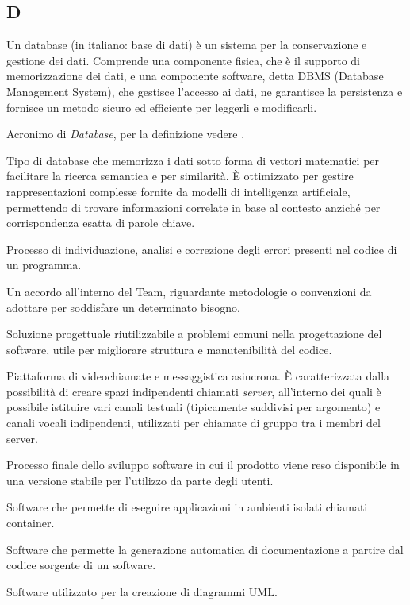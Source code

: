 \begin{center}
\section*{D}
\end{center}

Un database (in italiano: base di dati) è un sistema per la conservazione e gestione dei dati. Comprende una componente fisica, che è il supporto di memorizzazione dei dati, e una componente software, detta DBMS (Database Management System), che gestisce l’accesso ai dati, ne garantisce la persistenza e fornisce un metodo sicuro ed efficiente per leggerli e modificarli.

Acronimo di \textit{Database}, per la definizione vedere .

Tipo di database che memorizza i dati sotto forma di vettori matematici per facilitare la ricerca semantica e per similarità. È ottimizzato per gestire rappresentazioni complesse fornite da modelli di intelligenza artificiale, permettendo di trovare informazioni correlate in base al contesto anziché per corrispondenza esatta di parole chiave.

Processo di individuazione, analisi e correzione degli errori presenti nel codice di un programma.

Un accordo all'interno del Team, riguardante metodologie o convenzioni da adottare per soddisfare un determinato bisogno.

Soluzione progettuale riutilizzabile a problemi comuni nella progettazione del software, utile per migliorare struttura e manutenibilità del codice.

Piattaforma di videochiamate e messaggistica asincrona. È caratterizzata dalla possibilità di creare spazi indipendenti chiamati \textit{server}, all'interno dei quali è possibile istituire vari canali testuali (tipicamente suddivisi per argomento) e canali vocali indipendenti, utilizzati per chiamate di gruppo tra i membri del server.

Processo finale dello sviluppo software in cui il prodotto viene reso disponibile in una versione stabile per l’utilizzo da parte degli utenti.

Software che permette di eseguire applicazioni in ambienti isolati chiamati container.

Software che permette la generazione automatica di documentazione a partire dal codice sorgente di un software.

Software utilizzato per la creazione di diagrammi UML.

